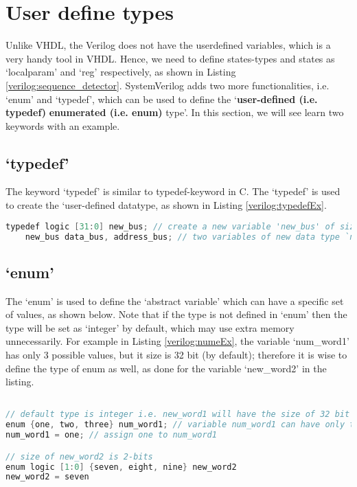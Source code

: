 


\section{User define types}
Unlike VHDL, the Verilog does not have the userdefined variables, which is a very handy tool in VHDL. Hence, we need to define states-types and states as `localparam' and `reg' respectively, as shown in Listing \ref{verilog:sequence_detector}. SystemVerilog adds two more functionalities, i.e. `enum' and `typedef', which can be used to define the `\textbf{user-defined (i.e. typedef)} \textbf{enumerated (i.e. enum)} type'. In this section, we will see learn two keywords with an example. 

\subsection{`typedef'}
The keyword `typedef' is similar to typedef-keyword in C. The `typedef' is used to create the `user-defined datatype, as shown in Listing \ref{verilog:typedefEx}. 

\begin{lstlisting}[language=Verilog, caption={`typedef' example}, label={verilog:typedefEx}]
	typedef logic [31:0] new_bus; // create a new variable 'new_bus' of size 32
	new_bus data_bus, address_bus; // two variables of new data type `new_bus'
\end{lstlisting}

\subsection{`enum'}
The `enum' is used to define the `abstract variable' which can have a specific set of values, as shown below. Note that if the type is not defined in `enum' then the type will be set as `integer' by default, which may use extra memory unnecessarily. For example in Listing \ref{verilog:numeEx}, the variable `num\_word1' has only 3 possible values, but it size is 32 bit (by default); therefore it is wise to define the type of enum as well, as done for the variable `new\_word2' in the listing. 
\begin{lstlisting}[language=Verilog, caption={`enum' example}, label={verilog:numeEx}]

// default type is integer i.e. new_word1 will have the size of 32 bit
enum {one, two, three} num_word1; // variable num_word1 can have only three types of values
num_word1 = one; // assign one to num_word1

// size of new_word2 is 2-bits
enum logic [1:0] {seven, eight, nine} new_word2
new_word2 = seven
\end{lstlisting}

